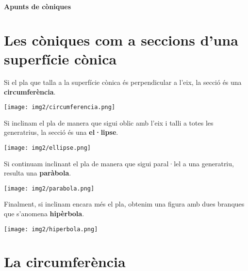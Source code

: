 \documentclass[11pt, a4paper, pdf]{article}
\begin{document}
\pagestyle{blocfancy}
\setcounter{myenumi}{0}
 
 \begin{center}
 {\Large  \textbf{Apunts de còniques}}
 \end{center}
 
 \vspace{-0.5cm}
 
\section{Les còniques com a seccions d'una superfície cònica}
\begin{theorybox}
	\begin{multicols}{4}
		\scriptsize
		Si el pla que talla a la superfície cònica és perpendicular a l'eix, la secció és una \textbf{circumferència}.
		\begin{center}
			\texttt{[image: img2/circumferencia.png]}
		\end{center}
		
		Si inclinam el pla de manera que sigui oblic amb l'eix i talli a totes les generatrius, la secció és una \textbf{el·lipse}.
		\begin{center}
			\texttt{[image: img2/ellipse.png]}
		\end{center}
		
		Si continuam inclinant el pla de manera que sigui paral·lel a una generatriu, resulta una \textbf{paràbola}.
		\begin{center}
			\texttt{[image: img2/parabola.png]}
		\end{center}
		
		Finalment, si inclinam encara més el pla, obtenim una figura amb dues branques que s'anomena \textbf{hipèrbola}.
		\begin{center}
			\texttt{[image: img2/hiperbola.png]}
		\end{center}
		
	\end{multicols}	
\end{theorybox}




\section{La circumferència}
\end{document}
